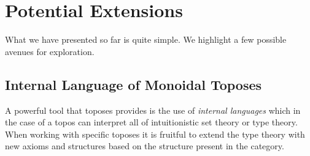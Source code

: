 \documentclass[12pt]{article}
\begin{document}





\section{Potential Extensions}

What we have presented so far is quite simple. We highlight a few
possible avenues for exploration.

\subsection{Internal Language of Monoidal Toposes}

A powerful tool that toposes provides is the use of \emph{internal
languages} which in the case of a topos can interpret all of
intuitionistic set theory or type theory. When working with specific
toposes it is fruitful to extend the type theory with new axioms and
structures based on the structure present in the category.
\end{document}
